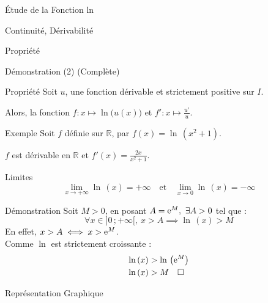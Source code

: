 \documentclass{coursbook}
\begin{document}
\begin{Gpartie}{Étude de la Fonction ln}
\begin{Spartie}{Continuité, Dérivabilité}
\begin{SSpartie}{Propriété}
\begin{SSSpartie}{Démonstration (2) (Complète)}
                \end{SSSpartie}
            \end{SSpartie}
            \begin{SSpartie}{Propriété}
                Soit $u$, une fonction dérivable et strictement positive sur $I$.

                Alors, la fonction $f:x\mapsto\ln\big(u(x)\big)$ et $\boxed{f':x\mapsto\frac{u'}{u}}$.
                \begin{SSSpartie}{Exemple}
                    Soit $f$ définie sur $\mathbb{R}$, par $f(x)=\ln\,(x^2+1)$.

                    $f$ est dérivable en $\mathbb{R}$ et $f'(x)=\frac{2x}{x^2+1}$.
                \end{SSSpartie}
            \end{SSpartie}
        \end{Spartie}
        \begin{Spartie}{Limites}
            \[\boxed{\lim_{x\to+\infty}\ln\,(x)=+\infty\quad\text{et}\quad\lim_{x\to 0}\ln\,(x)=-\infty}\]
            \begin{SSpartie}{Démonstration} 
                Soit $M>0$, en posant $A=\mathrm{e}^M,~\exists A>0$ tel que :
                \[\forall x\in\big]0\,;+\infty\big[,~x>A\implies\ln\,(x)>M\]
                En effet, $x>A\iff x>\mathrm{e}^M$. \\ Comme $\ln$ est strictement croissante :
                \[\begin{aligned}[t]
                    \ln\,(x)&>\ln\,\left(\mathrm{e}^M\right) \\
                    \ln\,(x)&>M\quad\square
                \end{aligned}\]
            \end{SSpartie}
        \end{Spartie}
        \begin{Spartie}{Représentation Graphique}
            \begin{center}
                \parbox{\linewidth}{}
            \end{center}
        \end{Spartie}
    \end{Gpartie}
\end{document}
